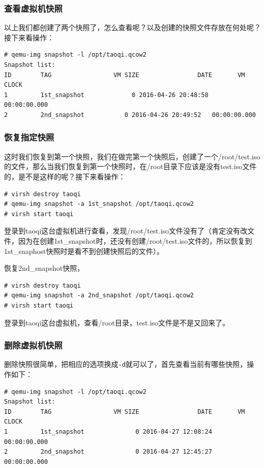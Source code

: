 \subsubsection{查看虚拟机快照}
\label{sec:listVmSnapShot}

以上我们都创建了两个快照了，怎么查看呢？以及创建的快照文件存放在何处呢？接下来看操作：

\begin{verbatim}
# qemu-img snapshot -l /opt/taoqi.qcow2 
Snapshot list:
ID        TAG                 VM SIZE                DATE       VM CLOCK
1         1st_snapshot             0 2016-04-26 20:48:58   00:00:00.000
2         2nd_snapshot           0 2016-04-26 20:49:52   00:00:00.000
\end{verbatim}

\subsubsection{恢复指定快照}
\label{sec:resumeSpecificVmSnapShost}

这时我们恢复到第一个快照，我们在做完第一个快照后，创建了一个/root/test.iso的文件，那么当我们恢复到第一个快照时，在/root目录下应该是没有test.iso文件的，是不是这样的呢？接下来看操作：

\begin{verbatim}
# virsh destroy taoqi
# qemu-img snapshot -a 1st_snapshot /opt/taoqi.qcow2
# virsh start taoqi
\end{verbatim}

登录到taoqi这台虚拟机进行查看，发现/root/test.iso文件没有了（肯定没有改文件，因为在创建1st\_snapshot时，还没有创建/root/test.iso文件的，所以恢复到1st\_snaphost快照时是看不到创建快照后的文件）。

恢复2nd\_snapshot快照，

\begin{verbatim}
# virsh destroy taoqi
# qemu-img snapshot -a 2nd_snapshot /opt/taoqi.qcow2
# virsh start taoqi
\end{verbatim}

登录到taoqi这台虚拟机，查看/root目录，test.iso文件是不是又回来了。

\subsubsection{删除虚拟机快照}
\label{sec:deleteVmSnapShot}

删除快照很简单，把相应的选项换成\verb|-d|就可以了，首先查看当前有哪些快照，操作如下：

\begin{verbatim}
# qemu-img snapshot -l /opt/taoqi.qcow2 
Snapshot list:
ID        TAG                 VM SIZE                DATE       VM CLOCK
1         1st_snapshot              0 2016-04-27 12:08:24   00:00:00.000
2         2nd_snapshot              0 2016-04-27 12:45:27   00:00:00.000
\end{verbatim}


